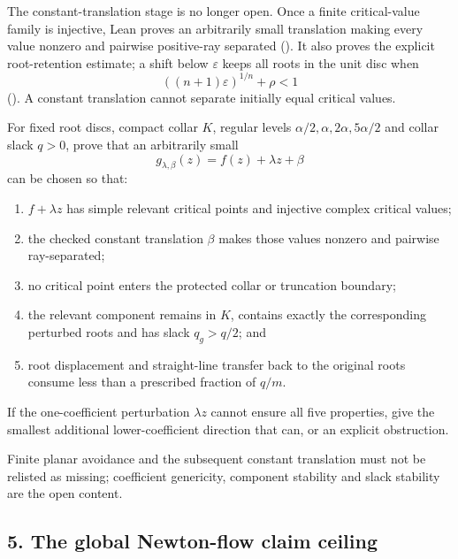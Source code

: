 \documentclass[11pt]{article}
\begin{document}
The constant-translation stage is no longer open.  Once a finite critical-value
family is injective, Lean proves an arbitrarily small translation making every
value nonzero and pairwise positive-ray separated
().  It also proves the
explicit root-retention estimate; a shift below $\varepsilon$ keeps all roots
in the unit disc when
\[
 ((n+1)\varepsilon)^{1/n}+\rho<1
\]
().  A constant translation
cannot separate initially equal critical values.

\begin{problem}\label{prob:perturb1041}
For fixed root discs, compact collar $K$, regular levels
$\alpha/2,\alpha,2\alpha,5\alpha/2$ and collar slack $q>0$, prove that an
arbitrarily small
\[
 g_{\lambda,\beta}(z)=f(z)+\lambda z+\beta
\]
can be chosen so that:

\begin{enumerate}
\item $f+\lambda z$ has simple relevant critical points and injective complex
critical values;
\item the checked constant translation $\beta$ makes those values nonzero and
pairwise ray-separated;
\item no critical point enters the protected collar or truncation boundary;
\item the relevant component remains in $K$, contains exactly the corresponding
perturbed roots and has slack $q_g>q/2$; and
\item root displacement and straight-line transfer back to the original roots
consume less than a prescribed fraction of $q/m$.
\end{enumerate}

If the one-coefficient perturbation $\lambda z$ cannot ensure all five
properties, give the smallest additional lower-coefficient direction that can,
or an explicit obstruction.
\end{problem}

Finite planar avoidance and the subsequent constant translation must not be
relisted as missing; coefficient genericity, component stability and slack
stability are the open content.

\subsection*{5. The global Newton-flow claim ceiling}
\end{document}
